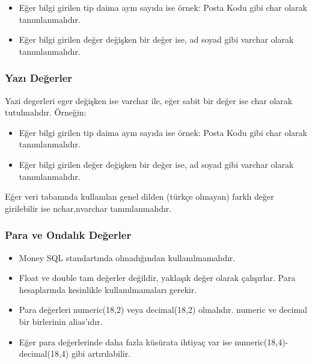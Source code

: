 \documentclass[10pt,a4paper,draft]{article}
\begin{document}
\begin{itemize}
\item Eğer bilgi girilen tip daima aynı sayıda ise örnek: Posta Kodu gibi char olarak tanımlanmalıdır.		 
\item Eğer bilgi girilen değer değişken bir değer ise, ad soyad gibi varchar olarak tanımlanmalıdır.
\end{itemize} 

\subsubsection{Yazı Değerler}
Yazi degerleri eger değişken ise varchar ile, eğer sabit bir değer ise char olarak tutulmalıdır. Örneğin:

\begin{itemize}
\item Eğer bilgi girilen tip daima aynı sayıda ise örnek: Posta Kodu gibi char olarak tanımlanmalıdır.		 
\item Eğer bilgi girilen değer değişken bir değer ise, ad soyad gibi varchar olarak tanımlanmalıdır.
\end{itemize} 

Eğer veri tabanında kullanılan genel dilden (türkçe olmayan) farklı değer girilebilir ise nchar,nvarchar tanımlanmalıdır.


\subsubsection{Para ve Ondalık Değerler}

\begin{itemize}
\item  Money SQL standartında olmadığından kullanılmamalıdır. 
\item  Float ve double tam değerler değildir, yaklaşık değer olarak çalışırlar. 
Para hesaplarında kesinlikle kullanılmamaları gerekir.
\item Para değerleri numeric(18,2) veya decimal(18,2) olmalıdır. numeric ve decimal bir birlerinin alias'ıdır. 
\item Eğer para değerlerinde daha fazla küsürata ihtiyaç var ise   numeric(18,4)-decimal(18,4) gibi artırılabilir. 

\end{itemize} 
 			
\end{document}
